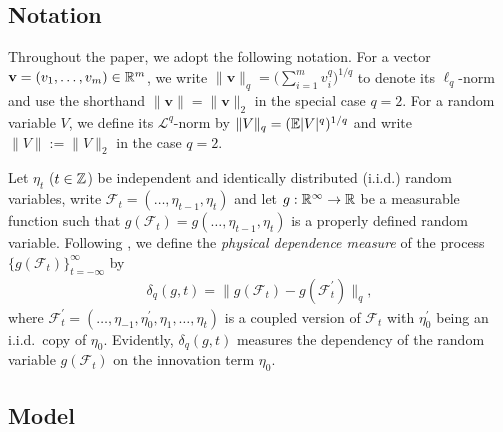 \documentclass[a4paper,12pt]{article}
\begin{document}
\subsection{Notation}




Throughout the paper, we adopt the following notation. For a vector $\mathbf{v} = (v_1, \ldots, v_m)\in\mathbb{R}^m$, we write $\|\mathbf{v}\|_q = \big(\sum_{i=1}^m v_i^q\big)^{1/q}$ to denote its $\ell_q$-norm and use the shorthand $\|\mathbf{v}\| = \|\mathbf{v}\|_2$ in the special case $q = 2$. For a random variable $V$, we define its $\mathcal{L}^q$-norm by $\|V\|_q = (\mathbb{E} |V|^q)^{1/q}$ and write $\|V\| := \|V\|_2$ in the case $q = 2$.


Let $\eta_t$ ($t \in \mathbb{Z}$) be independent and identically distributed ($\text{i.i.d.}$) random variables, write $\mathcal{F}_t  = (\ldots, \eta_{t-1}, \eta_t)$ and let $g: \mathbb{R}^\infty \to \mathbb{R}$ be a measurable function such that $g(\mathcal{F}_t) = g(\ldots, \eta_{t-1}, \eta_t)$ is a properly defined random variable. Following \cite{Wu2005}, we define the \textit{physical dependence measure} of the process $\{g(\mathcal{F}_t)\}_{t=-\infty}^\infty$ by
\begin{align}\label{eq:physical_dep}
\delta_q(g, t) = \| g(\mathcal{F}_t) - g(\mathcal{F}_t^\prime) \|_q,
\end{align}
where $\mathcal{F}_t^\prime  = (\ldots, \eta_{-1}, \eta^\prime_0, \eta_1, \ldots, \eta_t)$ is a coupled version of $\mathcal{F}_t$ with $\eta_0^\prime$ being an i.i.d.\ copy of $\eta_0$. Evidently, $\delta_q(g, t)$ measures the dependency of the random variable $g(\mathcal{F}_t)$ on the innovation term $\eta_0$. %


\subsection{Model}\label{subsec:model_setting}
\end{document}
